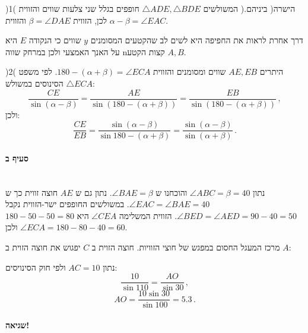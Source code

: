 \documentclass[12pt,a4paper]{article}
\begin{document}
)1( המשולשים
$\triangle ADE, \triangle BDE$
חופפים בגלל שני צלעות שווים והזווית )הישרה( ביניהם. לכן, הזווית
$\beta = \angle DAE$
והזווית
$\alpha - \beta = \angle EAC$.

דרך אחרת לראות את החפיפה היא לשים לב שהקטעים המסומנים
$y$
שווים כי הנקודה 
$E$
היא על האנך האמצעי ולכן במרחק שווה nקצות הקטע
$A,B$.

\medskip

)2( היתרים
$AE,EB$
שווים ומסומנים והזווית
$180 - (\alpha+\beta) = \angle ECA$.
לפי משפט הסינוסים במשולש
$\triangle ECA$:
\[
\frac{CE}{\sin (\alpha-\beta)}=\frac{AE}{\sin (180-(\alpha+\beta))}=\frac{EB}{\sin (180-(\alpha+\beta))}\,, 
\]
ולכן:
\[
\frac{CE}{EB}=\frac{\sin (\alpha-\beta)}{\sin 180-(\alpha+\beta)} =  \frac{\sin (\alpha-\beta)}{\sin (\alpha+\beta)}\,.
\]

\vspace{-4ex}\paragraph{סעיף ב}
\mbox{}\\

נתון 
$\angle ABC=\beta=40$
והוכחנו ש
$\angle BAE=\beta$.
נתון גם ש
$AE$
חוצה זווית כך ש
$\angle EAC=\angle BAE=40$.
במשולשים החופפים ישר-הזווית נקבל
$\angle BED=\angle AED=90-40=50$.
הזווית המשלימה
$\angle CEA$
היא
$180-50-50=80$
ולכן
$\angle ECA=180 - 80 - 40 =60$.

מרכז המעגל החסום במפגש של חוצי הזוויות. חוצה הזוית ב $C$ יפגוש את חוצה הזוית ב $A$: 
\begin{center}
\end{center}
נתון
$AC=10$
ולפי חוק הסינויסים:
\[
\frac{10}{\sin 110} = \frac{AO}{\sin 30}\,,
\]
\[
AO = \frac{10\sin 30}{\sin 100} = 5.3\,.
\]

\vspace{-4ex}\paragraph{שגיאה!}
\end{document}
